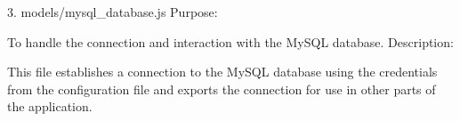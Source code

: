 3. models/mysql_database.js
Purpose:

To handle the connection and interaction with the MySQL database.
Description:

This file establishes a connection to the MySQL database using the
credentials from the configuration file and exports the connection
for use in other parts of the application.